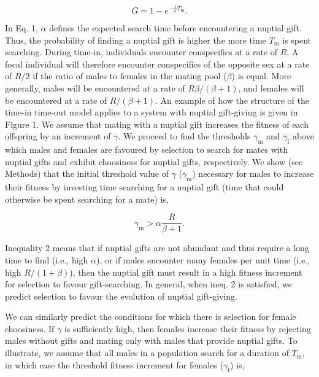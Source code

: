 \documentclass[
]{article}
\begin{document}
\begin{equation}
G = 1 - e^{-\frac{1}{\alpha}T_{\mathrm{m}}}.
\end{equation}

In Eq. 1, \(\alpha\) defines the expected search time before
encountering a nuptial gift. Thus, the probability of finding a nuptial
gift is higher the more time \(T_{\mathrm{m}}\) is spent searching.
During time-in, individuals encounter conspecifics at a rate of \(R\). A
focal individual will therefore encounter conspecifics of the opposite
sex at a rate of \(R/2\) if the ratio of males to females in the mating
pool (\(\beta\)) is equal. More generally, males will be encountered at
a rate of \(R\beta/(\beta+1)\), and females will be encountered at a
rate of \(R/(\beta+1)\). An example of how the structure of the time-in
time-out model applies to a system with nuptial gift-giving is given in
Figure 1. We assume that mating with a nuptial gift increases the
fitness of each offspring by an increment of \(\gamma\). We proceed to
find the thresholds \(\gamma_{\mathrm{m}}\) and \(\gamma_{\mathrm{f}}\)
above which males and females are favoured by selection to search for
mates with nuptial gifts and exhibit choosiness for nuptial gifts,
respectively. We show (see Methods) that the initial threshold value of
\(\gamma\) (\(\gamma_{\mathrm{m}}\)) necessary for males to increase
their fitness by investing time searching for a nuptial gift (time that
could otherwise be spent searching for a mate) is,

\begin{equation}
\gamma_{\mathrm{m}} > \alpha \frac{R}{\beta + 1}.
\end{equation}

Inequality 2 means that if nuptial gifts are not abundant and thus
require a long time to find (i.e., high \(\alpha\)), or if males
encounter many females per unit time (i.e., high \(R / (1+\beta)\)),
then the nuptial gift must result in a high fitness increment for
selection to favour gift-searching. In general, when ineq. 2 is
satisfied, we predict selection to favour the evolution of nuptial
gift-giving.

We can similarly predict the conditions for which there is selection for
female choosiness. If \(\gamma\) is sufficiently high, then females
increase their fitness by rejecting males without gifts and mating only
with males that provide nuptial gifts. To illustrate, we assume that all
males in a population search for a duration of \(T_{\mathrm{m}}\), in
which case the threshold fitness increment for females
(\(\gamma_{\mathrm{f}}\)) is,
\end{document}
